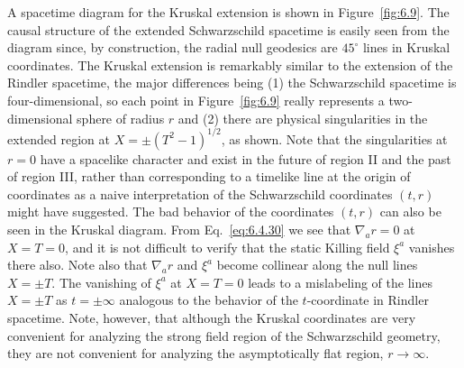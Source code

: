A spacetime diagram for the Kruskal extension is shown in Figure~\ref{fig:6.9}.
The causal structure of the extended Schwarzschild spacetime is easily seen from
the diagram since, by construction, the radial null geodesics are \(45^\circ\)
lines in Kruskal coordinates. The Kruskal extension is remarkably similar to the
extension of the Rindler spacetime, the major differences being (1) the
Schwarzschild spacetime is four-dimensional, so each point in
Figure~\ref{fig:6.9} really represents a two-dimensional sphere of radius \(r\)
and (2) there are physical singularities in the extended region at
\(X=\pm(T^2-1)^{1/2}\), as shown. Note that the singularities at \(r=0\) have a
spacelike character and exist in the future of region II and the past of region
III, rather than corresponding to a timelike line at the origin of coordinates as
a naive interpretation of the Schwarzschild coordinates \((t,r)\) might have
suggested. The bad behavior of the coordinates \((t,r)\) can also be seen in the
Kruskal diagram. From Eq.~\eqref{eq:6.4.30} we see that \(\nabla_a r=0\) at
\(X=T=0\), and it is not difficult to verify that the static Killing field
\(\xi^a\) vanishes there also. Note also that \(\nabla_a r\) and \(\xi^a\) become
collinear along the null lines \(X=\pm T\). The vanishing of \(\xi^a\) at
\(X=T=0\) leads to a mislabeling of the lines \(X=\pm T\) as
\(t=\pm\infty\) analogous to the behavior of the \(t\)-coordinate in Rindler
spacetime. Note, however, that although the Kruskal coordinates are very
convenient for analyzing the strong field region of the Schwarzschild geometry,
they are not convenient for analyzing the asymptotically flat region,
\(r\to\infty\).



